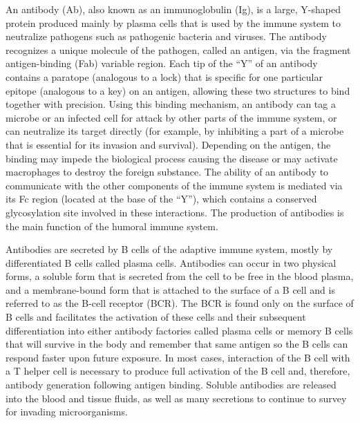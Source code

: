 An antibody (Ab), also known as an immunoglobulin (Ig), is a large, Y-shaped protein produced mainly by plasma cells that is used by the immune system to neutralize pathogens such as pathogenic bacteria and viruses. The antibody recognizes a unique molecule of the pathogen, called an antigen, via the fragment antigen-binding (Fab) variable region. Each tip of the ``Y'' of an antibody contains a paratope (analogous to a lock) that is specific for one particular epitope (analogous to a key) on an antigen, allowing these two structures to bind together with precision. Using this binding mechanism, an antibody can tag a microbe or an infected cell for attack by other parts of the immune system, or can neutralize its target directly (for example, by inhibiting a part of a microbe that is essential for its invasion and survival). Depending on the antigen, the binding may impede the biological process causing the disease or may activate macrophages to destroy the foreign substance. The ability of an antibody to communicate with the other components of the immune system is mediated via its Fc region (located at the base of the ``Y''), which contains a conserved glycosylation site involved in these interactions. The production of antibodies is the main function of the humoral immune system.

Antibodies are secreted by B cells of the adaptive immune system, mostly by differentiated B cells called plasma cells. Antibodies can occur in two physical forms, a soluble form that is secreted from the cell to be free in the blood plasma, and a membrane-bound form that is attached to the surface of a B cell and is referred to as the B-cell receptor (BCR). The BCR is found only on the surface of B cells and facilitates the activation of these cells and their subsequent differentiation into either antibody factories called plasma cells or memory B cells that will survive in the body and remember that same antigen so the B cells can respond faster upon future exposure. In most cases, interaction of the B cell with a T helper cell is necessary to produce full activation of the B cell and, therefore, antibody generation following antigen binding. Soluble antibodies are released into the blood and tissue fluids, as well as many secretions to continue to survey for invading microorganisms.

